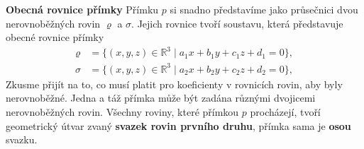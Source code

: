 \wikitextrule
\begin{example}\label{mai:exam041}
  \textbf{Obecná rovnice přímky}\newline\small
  Přímku \(p\) si snadno představíme jako průsečnici dvou nerovnoběžných rovin \(\varrho\) a 
  \(\sigma\). Jejich rovnice tvoří soustavu, která představuje obecné rovnice přímky
  \begin{subequations}\label{mai:eq042}
    \begin{align}
      \varrho &= \{(x, y, z)\in\mathbb{R}^3\mid a_1x + b_1y + c_1z + d_1 = 0 \},  \\ 
      \sigma  &= \{(x, y, z)\in\mathbb{R}^3\mid a_2x + b_2y + c_2z + d_2 = 0 \}, 
    \end{align}
  \end{subequations}
  Zkusme přijít na to, co musí platit pro koeficienty v rovnicích rovin, aby byly nerovnoběžné. 
  Jedna a táž přímka může být zadána různými dvojicemi nerovnoběžných rovin. Všechny roviny, které 
  přímkou \(p\) procházejí, tvoří geometrický útvar zvaný \textbf{svazek rovin prvního druhu}, 
  přímka sama je \textbf{osou} svazku.  
  \normalsize
\end{example}